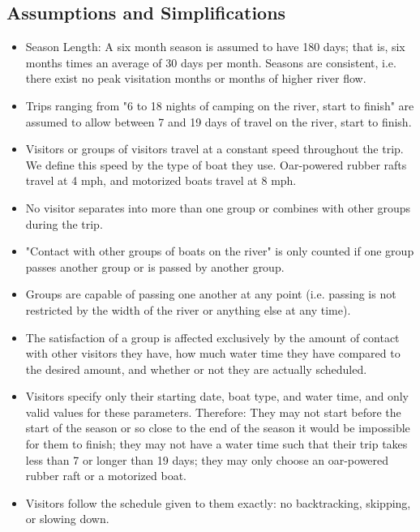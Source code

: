 \documentclass[11pt]{article} %
\begin{document}
\subsection{Assumptions and Simplifications}
\label{sec:assumptions}
\begin{itemize}
\item Season Length: A six month season is assumed to have 180 days; that is,
six months times an average of 30 days per month.  Seasons are consistent,
i.e. there exist no peak visitation months or months of higher river flow.

\item Trips ranging from "6 to 18 nights of camping on the river, start to
finish" are assumed to allow
between 7 and 19 days of travel on the river, start to finish.

\item Visitors or groups of visitors travel at a constant speed throughout the
trip.  We define this speed by the type of boat they use.  Oar-powered
rubber rafts travel at 4 mph, and motorized boats travel at 8 mph.

\item No visitor separates into more than one group or combines with other
groups during the trip.

\item "Contact with other groups of boats on the river" is only counted if
one group passes another group or is passed by another group.

\item Groups are capable of passing one another at any point (i.e. passing is
not restricted by the width of the river or anything else at any time).

\item The satisfaction of a group is affected exclusively by the amount of
contact with other visitors they have, how much water time they have
compared to the desired amount, and whether or not they
are actually scheduled.

\item Visitors specify only their starting date, boat type, and water time,
and only valid values for these parameters. Therefore: They may not start
before the start of the season or so close to the end of the season it
would be impossible for them to finish; they may not have a water time
such that their trip takes less than 7 or longer than 19 days; they may
only choose an oar-powered rubber raft or a motorized boat.

\item Visitors follow the schedule given to them exactly:
no backtracking, skipping, or slowing down.
\end{itemize}
\end{document}

